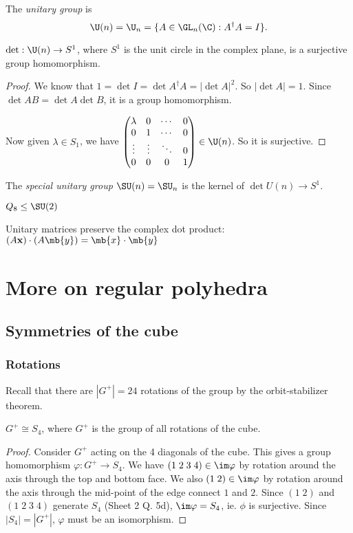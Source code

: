 \documentclass[a4paper]{article}
\begin{document}
\begin{defi}
  The \emph{unitary group} is
  \[
    \U(n) = \U_n = \{A\in \GL_n(\C): A^\dagger A = I\}.
  \]
\end{defi}

\begin{lemma}
  $\det: \U(n)\to S^1$, where $S^1$ is the unit circle in the complex plane, is a surjective group homomorphism.
\end{lemma}

\begin{proof}
  We know that $1 = \det I = \det A^\dagger A = |\det A|^2$. So $|\det A| = 1$. Since $\det AB = \det A\det B$, it is a group homomorphism.

  Now given $\lambda\in S_1$, we have
  $\begin{pmatrix}
    \lambda & 0 & \cdots & 0\\
    0 & 1 & \cdots & 0\\
    \vdots & \vdots & \ddots & 0\\
    0 & 0 & 0 & 1
  \end{pmatrix}\in \U(n)$. So it is surjective.
\end{proof}

\begin{defi}
  The \emph{special unitary group} $\SU(n) = \SU_n$ is the kernel of $\det U(n)\to S^1$.
\end{defi}
\note $Q_8 \leq \SU(2)$

Unitary matrices preserve the complex dot product: $(A\mathbf{x})\cdot (A\mb{y}) = \mb{x}\cdot \mb{y}$

\section{More on regular polyhedra}
\subsection{Symmetries of the cube}
\subsubsection{Rotations}
Recall that there are $|G^+| = 24$ rotations of the group by the orbit-stabilizer theorem.
\begin{prop}
  $G^+ \cong S_4$, where $G^+$ is the group of all rotations of the cube.
\end{prop}

\begin{proof}
  Consider $G^+$ acting on the 4 diagonals of the cube. This gives a group homomorphism $\varphi: G^+ \to S_4$. We have $(1\; 2\; 3\; 4)\in\im \varphi$ by rotation around the axis through the top and bottom face. We also $(1\; 2)\in \im \varphi$ by rotation around the axis through the mid-point of the edge connect $1$ and $2$. Since $(1\; 2)$ and $(1\; 2\; 3\; 4)$ generate $S_4$ (Sheet 2 Q. 5d), $\im\varphi = S_4$, ie. $\phi$ is surjective. Since $|S_4| = |G^+|$, $\varphi$ must be an isomorphism.
\end{proof}
\end{document}
